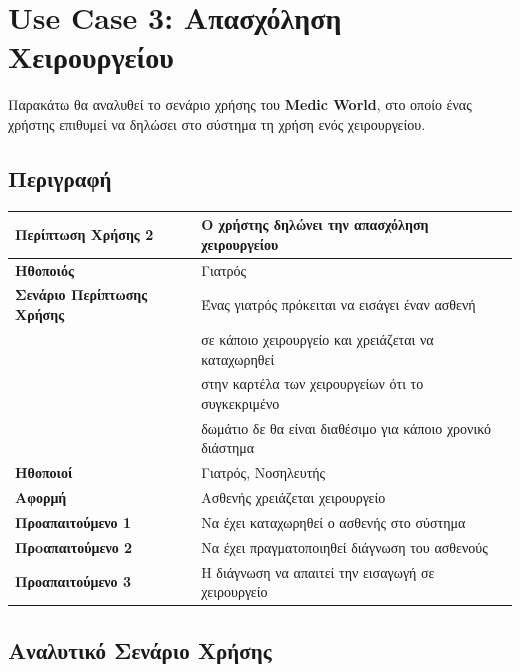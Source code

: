 \documentclass{article}
\newcommand\T{\rule{0pt}{2.6ex}}       %
\newcommand\B{\rule[-1.2ex]{0pt}{0pt}}
\begin{document}
 \section{Use Case 3: Απασχόληση Χειρουργείου}
 
 Παρακάτω θα αναλυθεί το σενάριο χρήσης του \textbf{Medic World}, στο οποίο ένας χρήστης επιθυμεί να δηλώσει στο σύστημα τη χρήση ενός χειρουργείου.

\subsection{Περιγραφή}

\begin{center}
     \begin{tabular}{|l|l|}
     \hline
      \textbf{Περίπτωση Χρήσης 2} & Ο χρήστης δηλώνει την απασχόληση χειρουργείου \T\B \\ 
      \hline
      \textbf{Ηθοποιός} & Γιατρός \T\B \\
      \hline
      \textbf{Σενάριο Περίπτωσης Χρήσης} & Ένας γιατρός πρόκειται να εισάγει έναν ασθενή \T \\& σε κάποιο χειρουργείο και χρειάζεται να καταχωρηθεί\\& στην καρτέλα των χειρουργείων ότι το συγκεκριμένο\\& δωμάτιο δε θα είναι διαθέσιμο για κάποιο χρονικό διάστημα \B \\
      \hline
      \textbf{Ηθοποιοί} & Γιατρός, Νοσηλευτής \T\B \\
      \hline
      \textbf{Αφορμή} & Ασθενής χρειάζεται χειρουργείο \T\B \\
      \hline
      \textbf{Προαπαιτούμενο 1} & Να έχει καταχωρηθεί ο ασθενής στο σύστημα \T\B \\
      \hline
      \textbf{Πρoαπαιτούμενο 2} & Να έχει πραγματοποιηθεί διάγνωση του ασθενούς \T\B \\
      \hline
      \textbf{Προαπαιτούμενο 3} & Η διάγνωση να απαιτεί την εισαγωγή σε χειρουργείο \T\B \\
      \hline
     \end{tabular}
 \end{center}
 
   \subsection{Αναλυτικό Σενάριο Χρήσης}
 
\end{document}
